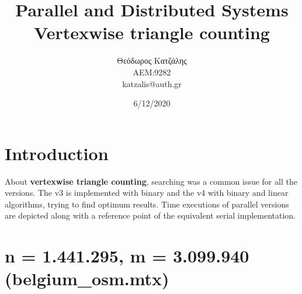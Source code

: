 \documentclass[12pt, a4paper]{article}
\title{\textbf{Parallel and Distributed Systems \\ Vertexwise triangle counting}}
\author{Θεόδωρος Κατζάλης \\ ΑΕΜ:9282 \\ katzalis@auth.gr}
\date{6/12/2020}
\begin{document}
\sloppy
%
\maketitle



\section{Introduction}
\vspace{0.05cm}
About \textbf{vertexwise triangle counting}, searching was a common issue for all the versions. The v3 is implemented with binary and the v4 with binary and linear algorithms, trying to find optimum results. Time executions of parallel versions are depicted along with a reference point  of the equivalent serial implementation.

\section{n = 1.441.295, m = 3.099.940 (belgium\_osm.mtx)}
\end{document}
